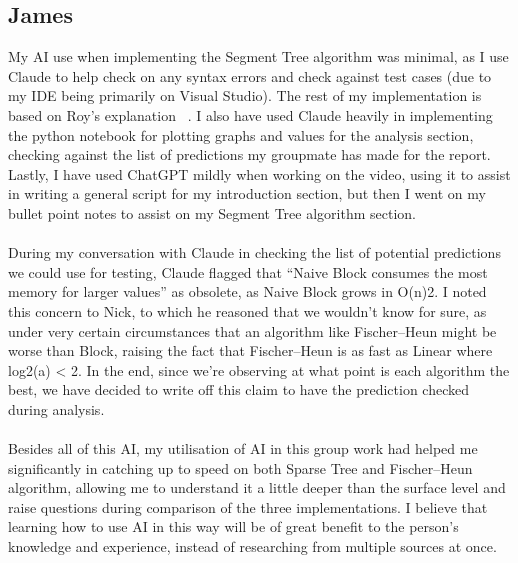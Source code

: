 \documentclass{article}
\theoremstyle{definition}
\begin{document}
\subsection{James}
My AI use when implementing the Segment Tree algorithm was minimal, as I use Claude to help check on any syntax errors and check against test cases (due to my IDE being primarily on Visual Studio). The rest of my implementation is based on Roy's explanation ~\cite{roy2015}.  I also have used Claude heavily in implementing the python notebook for plotting graphs and values for the analysis section, checking against the list of predictions my groupmate has made for the report. Lastly, I have used ChatGPT mildly when working on the video, using it to assist in writing a general script for my introduction section, but then I went on my bullet point notes to assist on my Segment Tree algorithm section.
\\
\\
During my conversation with Claude in checking the list of potential predictions we could use for testing, Claude flagged that “Naive Block consumes the most memory for larger values” as obsolete, as Naive Block grows in O(n)2. I noted this concern to Nick, to which he reasoned that we wouldn’t know for sure, as under very certain circumstances that an algorithm like Fischer--Heun might be worse than Block, raising the fact that Fischer--Heun is as fast as Linear where log2(a) < 2. In the end, since we’re observing at what point is each algorithm the best, we have decided to write off this claim to have the prediction checked during analysis.
\\
\\
Besides all of this AI, my utilisation of AI in this group work had helped me significantly in catching up to speed on both Sparse Tree and Fischer--Heun algorithm, allowing me to understand it a little deeper than the surface level and raise questions during comparison of the three implementations. I believe that learning how to use AI in this way will be of great benefit to the person’s knowledge and experience, instead of researching from multiple sources at once.
\end{document}
